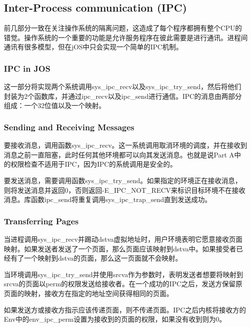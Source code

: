 \subsection{Inter-Process communication (IPC)}
\par 前几部分一致在关注操作系统的隔离问题，这造成了每个程序都拥有整个CPU的错觉。操作系统的一个重要的功能是允许服务程序在彼此需要是进行通讯。进程间通讯有很多模型，但在jOS中只会实现一个简单的IPC机制。

\subsubsection{IPC in JOS}
\par 这一部分将实现两个系统调用sys\_ipc\_recv以及sys\_ipc\_try\_send，然后将他们封装为2个函数库，并通过ipc\_recv以及ipc\_send进行通信。IPC的消息由两部分组成：一个32位值以及一个映射。

\subsubsection{Sending and Receiving Messages}
\par 要接收消息，调用函数sys\_ipc\_recv。这一系统调用取消环境的调度，并在接收到消息之前一直阻塞，此时任何其他环境都可以向其发送消息。也就是说Part A中的权限检查不适用于IPC，因为IPC的系统调用是安全的。
\par 要发送消息，需要调用函数sys\_ipc\_try\_send。如果指定的环境正在接收消息，则将发送消息并返回0，否则返回-E\_IPC\_NOT\_RECV来标识目标环境不在接收消息。库函数ipc\_send将重复调用sys\_ipc\_trap\_send直到发送成功。

\subsubsection{Transferring Pages}
\par 当进程调用sys\_ipc\_recv并踢动dstva虚拟地址时，用户环境表明它愿意接收页面映射。如果发送者发送了一个页面，那么页面应该映射到dstva中。如果接受者已经有了一个映射到dstva的页面，那么这一页面就不会映射。
\par 当环境调用sys\_ipc\_try\_send并使用srcva作为参数时，表明发送者想要将映射到srcva的页面以perm的权限发送给接收者。在一个成功的IPC之后，发送方保留原页面的映射，接收方在指定的地址空间获得相同的页面。
\par 如果发送方或接收方指示应该传递页面，则不传递页面。IPC之后内核将接收方的Env中的env\_ipc\_perm设置为接收到的页面的权限，如果没有收到则为0。

